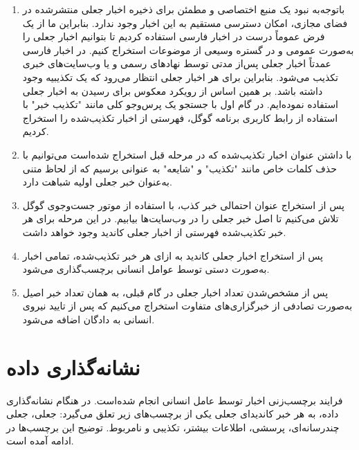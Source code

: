 \begin{enumerate}
\item باتوجه‌به نبود یک منبع اختصاصی و مطمئن برای ذخیره اخبار جعلی منتشرشده در فضای مجازی، امکان دسترسی مستقیم به این اخبار وجود ندارد. بنابراین ما از یک فرض عموماً درست در اخبار فارسی استفاده کردیم تا بتوانیم اخبار جعلی را به‌صورت عمومی و در گستره وسیعی از موضوعات استخراج کنیم. در اخبار فارسی عمدتاً اخبار جعلی پس‌از مدتی توسط نهاد‌های رسمی و یا وب‌سایت‌های خبری تکذیب می‌شود. بنابراین برای هر اخبار جعلی انتظار می‌رود که یک تکذیبیه وجود داشته باشد. بر همین اساس از رویکرد معکوس برای رسیدن به اخبار جعلی استفاده نموده‌ایم. در گام اول با جستجو یک پرس‌و‌جو کلی مانند "تکذیب خبر" با استفاده از رابط کاربری برنامه گوگل، فهرستی از اخبار تکذیب‌شده را استخراج کردیم.
\item با داشتن عنوان اخبار تکذیب‌شده که در مرحله قبل استخراج شده‌است می‌توانیم با حذف کلمات خاص مانند "تکذیب" و "شایعه" به عنوانی برسیم که از لحاظ متنی به‌عنوان خبر جعلی اولیه شباهت دارد.

\item پس از استخراج عنوان احتمالی خبر کذب، با استفاده از موتور جست‌وجوی گوگل تلاش می‌کنیم تا اصل خبر جعلی را در وب‌سایت‌ها بیابیم. در این مرحله برای هر  خبر تکذیب‌شده فهرستی از اخبار جعلی کاندید وجود خواهد داشت.

\item پس از استخراج اخبار جعلی کاندید به ازای هر خبر تکذیب‌شده، تمامی اخبار   به‌صورت دستی توسط عوامل انسانی برچسب‌گذاری می‌شود.

\item پس از مشخص‌شدن تعداد اخبار جعلی در گام قبلی، به همان تعداد خبر اصیل به‌صورت تصادفی از خبرگزاری‌های متفاوت استخراج می‌کنیم که پس از تایید نیروی انسانی به دادگان اضافه می‌شود.
\end{enumerate}

\section{نشانه‌گذاری داده}
فرایند برچسب‌زنی اخبار توسط عامل انسانی انجام شده‌است.  در هنگام نشانه‌گذاری داده، به هر خبر کاندیدای جعلی یکی از برچسب‌های زیر تعلق می‌گیرد: جعلی، جعلی چندرسانه‌ای، پرسشی، اطلاعات بیشتر، تکذیبی و نامربوط. توضیح این برچسب‌ها در ادامه آمده است. \\

